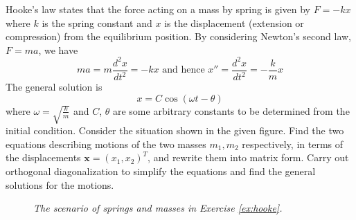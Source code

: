 \begin{Exercise}
\label{ex:hooke}
Hooke's law states that the force acting on a mass by spring is given by $F = -kx$ where $k$ is the spring constant and $x$ is the displacement (extension or compression) from the equilibrium position. By considering Newton's second law, $F = ma$, we have
\begin{equation*}
ma = m\frac{d^2x}{dt^2} = -kx\text{ and hence }x'' = \frac{d^2x}{dt^2} = -\frac{k}{m}x
\end{equation*}
The general solution is
\begin{equation*}
x = C\cos(\omega t - \theta)
\end{equation*}
where $\omega = \sqrt{\frac{k}{m}}$ and $C$, $\theta$ are some arbitrary constants to be determined from the initial condition. Consider the situation shown in the given figure. Find the two equations describing motions of the two masses $m_1, m_2$ respectively, in terms of the displacements $\textbf{x} = (x_1, x_2)^T$, and rewrite them into matrix form. Carry out orthogonal diagonalization to simplify the equations and find the general solutions for the motions.
\begin{figure}[t!]
\centering
{}  
\caption{\textit{The scenario of springs and masses in Exercise \ref{ex:hooke}.}}
\end{figure}
\end{Exercise}
